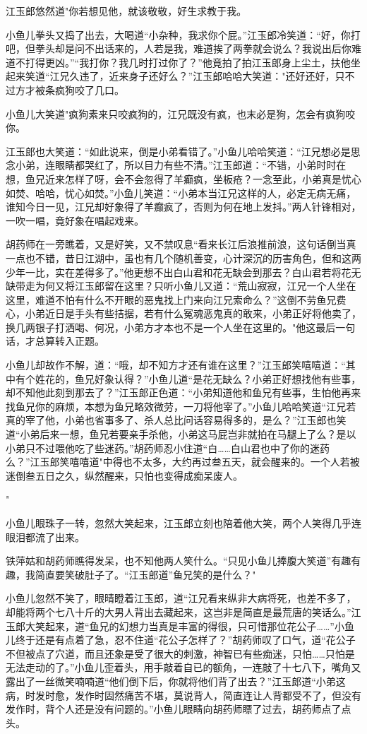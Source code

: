 \documentclass[12pt,oneside]{book}
\begin{document}
江玉郎悠然道"你若想见他，就该敬敬，好生求教于我。

小鱼儿拳头又捣了出去，大喝道``小杂种，我求你个屁。''江玉郎冷笑道：``好，你打吧，但拳头却是问不出话来的，人若是我，难道挨了两拳就会说么？我说出后你难道不打得更凶。''``我打你？我几时打过你了？''他竟拍了拍江玉郎身上尘土，扶他坐起来笑道``江兄久违了，近来身子还好么？''江玉郎哈哈大笑道："还好还好，只不过方才被条疯狗咬了几口。

小鱼儿大笑道"疯狗素来只咬疯狗的，江兄既没有疯，也末必是狗，怎会有疯狗咬你。

江玉郎也大笑道：``如此说来，倒是小弟看错了。''小鱼儿哈哈笑道：``江兄想必是思念小弟，连眼睛都哭红了，所以目力有些不清。''江玉郎道：``不错，小弟时时在想，鱼兄近来怎样了呀，会不会忽得了羊癫疯，坐板疮？一念至此，小弟真是忧心如焚、哈哈，忧心如焚。''小鱼儿笑道：``小弟本当江兄这样的人，必定无病无痛，谁知今日一见，江兄却好象得了羊癫疯了，否则为何在地上发抖。''两人针锋相对，一吹一唱，竟好象在唱起戏来。

胡药师在一旁瞧着，又是好笑，又不禁叹息``看来长江后浪推前浪，这句话倒当真一点也不错，昔日江湖中，虽也有几个随机善变，心计深沉的历害角色，但和这两少年一比，实在差得多了。''他更想不出白山君和花无缺会到那去？白山君若将花无缺带走为何又将江玉郎留在这里？只听小鱼儿又道：``荒山寂寂，江兄一个人坐在这里，难道不怕有什么不开眼的恶鬼找上门来向江兄索命么？''这倒不劳鱼兄费心，小弟近日是手头有些拮据，若有什么冤魂恶鬼真的敢来，小弟正好将他卖了，换几两银子打洒喝、何况，小弟方才本也不是一个人坐在这里的。"他这最后一句话，才总算转入正题。

小鱼儿却故作不解，道：``哦，却不知方才还有谁在这里？''江玉郎笑嘻嘻道：``其中有个姓花的，鱼兄好象认得？''小鱼儿道``是花无缺么？小弟正好想找他有些事，却不知他此刻到那去了？''江玉郎正色道：``小弟知道他和鱼兄有些事，生怕他再来找鱼兄你的麻烦，本想为鱼兄略效微劳，一刀将他宰了。''小鱼儿哈哈笑道``江兄若真的宰了他，小弟也省事多了、杀人总比问话容易得多的，是么？''江玉郎也笑道``小弟后来一想，鱼兄若要亲手杀他，小弟这马屁岂非就拍在马腿上了么？是以小弟只不过喂他吃了些迷药。''胡药师忍小住道``白\ldots\ldots 白山君也中了你的迷药么？''江玉郎笑嘻嘻道"中得也不太多，大约再过叁五天，就会醒来的。一个人若被迷倒叁五日之久，纵然醒来，只怕也变得成痴呆废人。

"

小鱼儿眼珠子一转，忽然大笑起来，江玉郎立刻也陪着他大笑，两个人笑得几乎连眼泪都流了出来。

铁萍姑和胡药师瞧得发呆，也不知他两人笑什么。``只见小鱼儿捧腹大笑道''有趣有趣，我简直要笑破肚子了。``江玉郎道''鱼兄笑的是什么？"

小鱼儿忽然不笑了，眼晴瞪着江玉郎，道``江兄看来纵非大病将死，也差不多了，却能将两个七八十斤的大男人背出去藏起来，这岂非是简直是最荒唐的笑话么。''江玉郎大笑起来，道``鱼兄的幻想力当真是丰富的得很，只可惜那位花公子\ldots\ldots{}''小鱼儿终于还是有点着了急，忍不住道``花公子怎样了？''胡药师叹了口气，道``花公子不但被点了穴道，而且还象是受了很大的刺激，神智已有些痴迷，只怕\ldots\ldots 只怕是无法走动的了。''小鱼儿歪着头，用手敲着自已的额角，一连敲了十七八下，嘴角又露出了一丝微笑喃喃道``他们倒下后，你就将他们背了出去？''江玉郎道``小弟这病，时发时愈，发作时固然痛苦不堪，莫说背人，简直连让人背都受不了，但没有发作时，背个人还是没有问题的。''小鱼儿眼睛向胡药师瞟了过去，胡药师点了点头。
\end{document}
